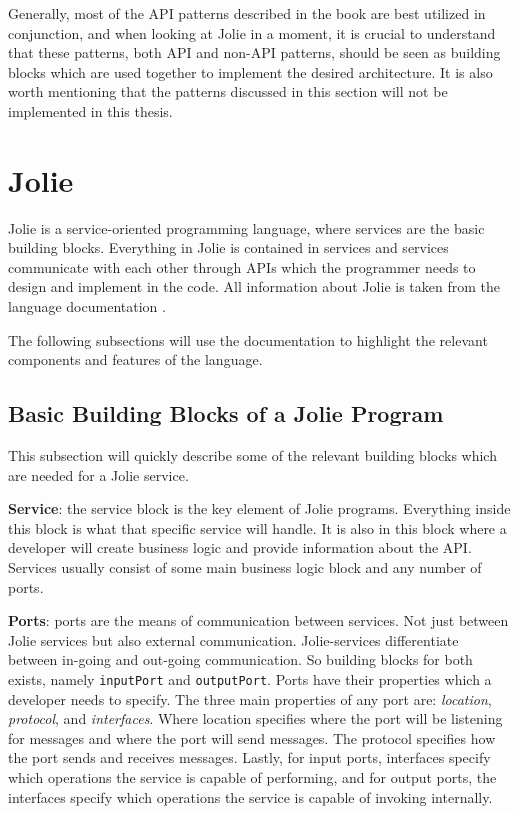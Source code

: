 Generally, most of the API patterns described in the book are best utilized in conjunction,
and when looking at Jolie in a moment, it is crucial to understand that these patterns, both API and non-API patterns,
should be seen as building blocks which are used together to implement the desired architecture.
It is also worth mentioning that the patterns discussed in this section will not be implemented in this thesis.

\section{Jolie}
Jolie is a service-oriented programming language, where services are the basic building blocks.
Everything in Jolie is contained in services and services communicate with each other through APIs which the programmer needs to design and implement in the code. All information about Jolie 
is taken from the language documentation \cite{jolie}.

The following subsections will use the documentation to highlight the relevant components and features of the language.

\subsection{Basic Building Blocks of a Jolie Program}
This subsection will quickly describe some of the relevant building blocks which are needed for a Jolie service.

\textbf{Service}: the service block is the key element of Jolie programs. Everything inside this block is what that specific service will handle. It is also 
in this block where a developer will create business logic and provide information about the API. Services usually consist of some main business logic block and any number of ports.

\textbf{Ports}: ports are the means of communication between services. Not just between Jolie services but also external communication.
Jolie-services differentiate between in-going and out-going communication. So building blocks for both exists, namely \texttt{inputPort} and \texttt{outputPort}.
Ports have their properties which a developer needs to specify. The three main properties of any port are: \textit{location}, \textit{protocol}, and \textit{interfaces}.
Where location specifies where the port will be listening for messages and where the port will send messages.
The protocol specifies how the port sends and receives messages. Lastly, for input ports, interfaces specify which
operations the service is capable of performing, and for output ports, the interfaces specify which
operations the service is capable of invoking internally. 

